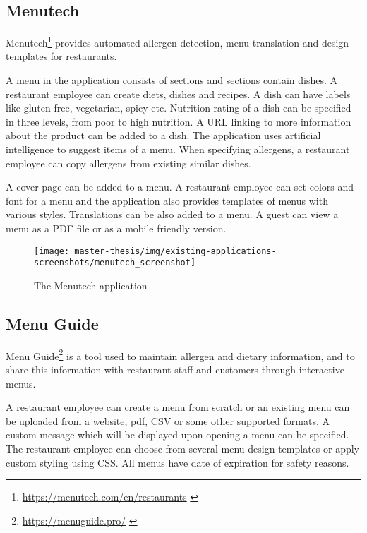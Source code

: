 \subsection*{Menutech}
  Menutech\footnote{\url{https://menutech.com/en/restaurants}  \label{fnlabel}} provides automated allergen detection, menu translation and design templates for restaurants.
  
  A menu in the application consists of sections and sections contain dishes.
  A restaurant employee can create diets, dishes and recipes.
  A dish can have labels like gluten-free, vegetarian, spicy etc.
  Nutrition rating of a dish can be specified in three levels, from poor to high nutrition.
  A URL linking to more information about the product can be added to a dish.
  The application uses artificial intelligence to suggest items of a menu.
  When specifying allergens, a restaurant employee can copy allergens from existing similar dishes.

  A cover page can be added to a menu.
  A restaurant employee can set colors and font for a menu and the application also provides templates of menus with various styles.
  Translations can be also added to a menu.
  A guest can view a menu as a PDF file or as a mobile friendly version.

  \begin{figure}[h]
    \centering
    \texttt{[image: master-thesis/img/existing-applications-screenshots/menutech\_screenshot]}
    \caption{The Menutech application}
  \end{figure}

\newpage

\subsection*{Menu Guide}
  Menu Guide\footnote{\url{https://menuguide.pro/}  \label{fnlabel}} is a tool used to maintain allergen and dietary information, and to share this information with restaurant staff and customers through interactive menus.

  A restaurant employee can create a menu from scratch or an existing menu can be uploaded from a website, pdf, CSV or some other supported formats. 
  A custom message which will be displayed upon opening a menu can be specified.
  The restaurant employee can choose from several menu design templates or apply custom styling using CSS.
  All menus have date of expiration for safety reasons.

